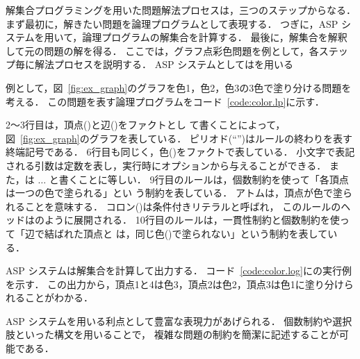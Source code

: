 


解集合プログラミングを用いた問題解法プロセスは，三つのステップからなる．
まず最初に，解きたい問題を論理プログラムとして表現する．
つぎに，ASP システムを用いて，論理プログラムの解集合を計算する．
最後に，解集合を解釈して元の問題の解を得る．
%
ここでは，グラフ点彩色問題を例として，各ステップ毎に解法プロセスを説明する．
ASP システムとしては{\clingo}を用いる

例として，図~\ref{fig:ex_graph}のグラフを色1，色2，色3の3色で塗り分ける問題を考える．
この問題を表す論理プログラムをコード~\ref{code:color.lp}に示す．

2〜3行目は，頂点()と辺()をファクトとし
て書くことによって，図~\ref{fig:ex_graph}のグラフを表している．
ピリオド(``'')はルールの終わりを表す終端記号である．
6行目も同じく，色()をファクトで表している．
小文字で表記される引数は定数を表し，{\clingo}実行時にオプションから与えることができる．
また，は  $\ldots$ と書くことに等しい．
%
9行目のルールは，個数制約を使って「各頂点は一つの色で塗られる」とい
う制約を表している．
アトムは，頂点が色で塗られることを意味する．
コロン(\code{:})は条件付きリテラルと呼ばれ，
このルールのヘッドはのように展開される．
10行目のルールは，一貫性制約と個数制約を使って「辺で結ばれた頂点と
は，同じ色()で塗られない」という制約を表している．

ASP システムは解集合を計算して出力する．
コード~\ref{code:color.log}に{\clingo}の実行例を示す．
この出力から，頂点1と4は色3，頂点2は色2，頂点3は色1に塗り分けられることがわかる．

ASP システムを用いる利点として豊富な表現力があげられる．
個数制約や選択肢といった構文を用いることで，
複雑な問題の制約を簡潔に記述することが可能である．

